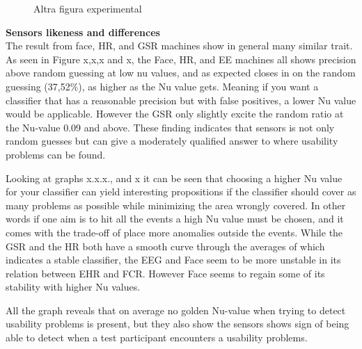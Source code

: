 \begin{figure}[h!]
\begin{minipage}[t]{0.5\textwidth}
    \caption{Altra figura experimental}
    \label{fase2}
  \end{minipage}
\end{figure}

\textbf{Sensors likeness and differences}\\
The result from face, HR, and GSR machines show in general many similar trait.
As seen in Figure x,x,x and x, the Face, HR, and EE machines all shows precision above random guessing at low nu values, and as expected closes in on the random guessing (37,52\%), as higher as the Nu value gets. Meaning if you want a classifier that has a reasonable precision but with false positives, a lower Nu value would be applicable. However the GSR only slightly excite the random ratio at the Nu-value 0.09 and above.
These finding indicates that sensors is not only random guesses but can give a moderately qualified answer to where usability problems can be found.

Looking at graphs x.x.x., and x it can be seen that choosing a higher Nu value for your classifier can yield interesting propositions if the classifier should cover as many problems as possible while minimizing the area wrongly covered.
In other words if one aim is to hit all the events a high Nu value must be chosen, and it comes with the trade-off of place more anomalies outside the events. 
While the GSR and the HR both have a smooth curve through the averages of which indicates a stable classifier, the EEG and Face seem to be more unstable in its relation between EHR and FCR. However Face seems to regain some of its stability with higher Nu values.

All the graph reveals that on average no golden Nu-value when trying to detect usability problems is present, but they also show the sensors shows sign of being able to detect when a test participant encounters a usability problems.

